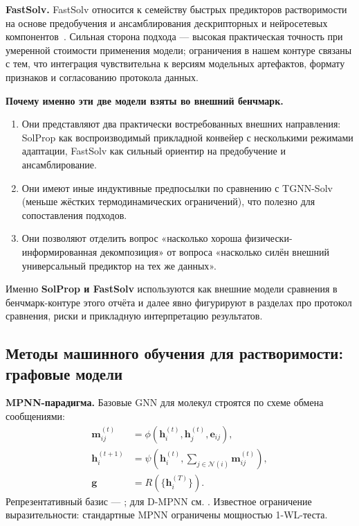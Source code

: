 \documentclass[11pt]{article}
\begin{document}
\textbf{FastSolv.} FastSolv относится к семейству быстрых предикторов растворимости на основе предобучения и ансамблирования дескрипторных и нейросетевых компонентов~\cite{osanloo2024}. Сильная сторона подхода --- высокая практическая точность при умеренной стоимости применения модели; ограничения в нашем контуре связаны с тем, что интеграция чувствительна к версиям модельных артефактов, формату признаков и согласованию протокола данных.

\textbf{Почему именно эти две модели взяты во внешний бенчмарк.}
\begin{enumerate}
  \item Они представляют два практически востребованных внешних направления: SolProp как воспроизводимый прикладной конвейер с несколькими режимами адаптации, FastSolv как сильный ориентир на предобучение и ансамблирование.
  \item Они имеют иные индуктивные предпосылки по сравнению с TGNN-Solv (меньше жёстких термодинамических ограничений), что полезно для сопоставления подходов.
  \item Они позволяют отделить вопрос «насколько хороша физически-информированная декомпозиция» от вопроса «насколько силён внешний универсальный предиктор на тех же данных».
\end{enumerate}

Именно \textbf{SolProp и FastSolv} используются как внешние модели сравнения в бенчмарк-контуре этого отчёта и далее явно фигурируют в разделах про протокол сравнения, риски и прикладную интерпретацию результатов.

\subsection{Методы машинного обучения для растворимости: графовые модели}

\textbf{MPNN-парадигма.} Базовые GNN для молекул строятся по схеме обмена сообщениями:
\begin{align*}
\mathbf{m}_{ij}^{(t)} &= \phi\!\left(\mathbf{h}_i^{(t)},\mathbf{h}_j^{(t)},\mathbf{e}_{ij}\right),\\
\mathbf{h}_i^{(t+1)} &= \psi\!\left(\mathbf{h}_i^{(t)},\sum_{j\in\mathcal{N}(i)}\mathbf{m}_{ij}^{(t)}\right),\\
\mathbf{g} &= R\!\left(\{\mathbf{h}_i^{(T)}\}\right).
\end{align*}
Репрезентативный базис --- \cite{gilmer2017}; для D-MPNN см. \cite{yang2019}. Известное ограничение выразительности: стандартные MPNN ограничены мощностью 1-WL-теста.
\end{document}
